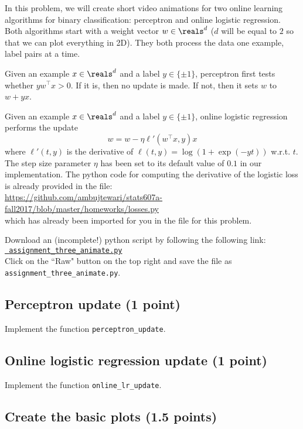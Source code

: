 \documentclass{article}
\begin{document}
In this problem, we will create short video animations for two online learning algorithms for
binary classification: perceptron and online logistic regression.
Both algorithms start with a weight vector $w \in \reals^d$ ($d$ will be equal to $2$ so that we can plot everything in 2D).
They both process the data one example, label pairs at a time.

Given an example $x \in \reals^d$ and a label $y \in \{\pm 1\}$,
perceptron first tests whether $y w^\top x > 0$. If it is, then no update is made. If not, then it sets
$w$ to $w + y x$.

Given an example $x \in \reals^d$ and a label $y \in \{\pm 1\}$,
online logistic regression performs the update
$$
w = w - \eta \ell'(w^\top x, y) x
$$
where $\ell'(t, y)$ is the derivative of $\ell(t,y) = \log(1+\exp(-yt))$ w.r.t. $t$. The step size parameter
$\eta$ has been set to its default value of $0.1$ in our implementation. The python code for computing the derivative
of the logistic loss is already provided in the file:\\
\url{https://github.com/ambujtewari/stats607a-fall2017/blob/master/homeworks/losses.py}\\
which has already been imported for you in the file for this problem.

Download an (incomplete!) python script by following the following
link:\\
\href{https://github.com/ambujtewari/stats607a-fall2017/blob/master/homeworks/assignment_three_animate.py}{\tt
assignment\_three\_animate.py} \\
Click on the ``Raw" button on the top right and save the file as {\tt
assignment\_three\_animate.py}.

\subsection{Perceptron update (1 point)}

Implement the function {\tt perceptron\_update}.

\subsection{Online logistic regression update (1 point)}

Implement the function {\tt online\_lr\_update}.

\subsection{Create the basic plots (1.5 points)}
\end{document}
